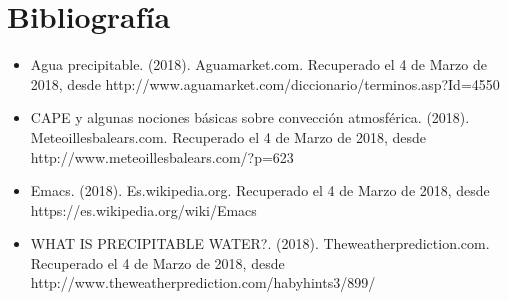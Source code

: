 \documentclass[12pt]{article}
\begin{document}
\section*{Bibliografía}
\begin{itemize}
\item Agua precipitable. (2018). Aguamarket.com.  Recuperado el 4 de Marzo de 2018, desde http://www.aguamarket.com/diccionario/terminos.asp?Id=4550
\item  CAPE y algunas nociones básicas sobre convección atmosférica. (2018).\\ Meteoillesbalears.com.  Recuperado el 4 de Marzo de 2018, desde \\ http://www.meteoillesbalears.com/?p=623
\item  Emacs. (2018). Es.wikipedia.org.  Recuperado el 4 de Marzo de 2018, desde https://es.wikipedia.org/wiki/Emacs
\item  WHAT IS PRECIPITABLE WATER?. (2018). Theweatherprediction.com.\\ Recuperado el 4 de Marzo de 2018, desde\\ http://www.theweatherprediction.com/habyhints3/899/
\end{itemize}
\end{document}
